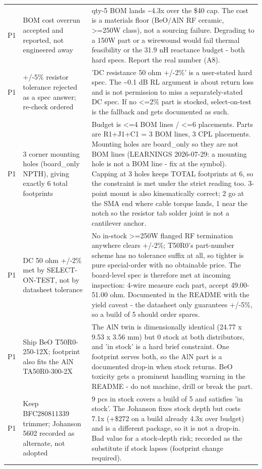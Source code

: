 \documentclass[11pt,a4paper]{article}
\begin{document}
{\begin{longtable}{lp{5.2cm}p{7.2cm}}
P1 & BOM cost overrun accepted and reported, not engineered away & qty-5 BOM lands \textasciitilde{}4.3x over the \$40 cap. The cost is a materials floor (BeO/AlN RF ceramic, \textgreater{}=250W class), not a sourcing failure. Degrading to a 150W part or a wirewound would fail thermal feasibility or the 31.9 nH reactance budget - both hard specs. Report the real number (A8). \\
P1 & +/-5\% resistor tolerance rejected as a spec answer; re-check ordered & 'DC resistance 50 ohm +/-2\%' is a user-stated hard spec. The \textasciitilde{}0.1 dB RL argument is about return loss and is not permission to miss a separately-stated DC spec. If no \textless{}=2\% part is stocked, select-on-test is the fallback and gets documented as such. \\
P1 & 3 corner mounting holes (board\_only NPTH), giving exactly 6 total footprints & Budget is \textless{}=4 BOM lines / \textless{}=6 placements. Parts are R1+J1+C1 = 3 BOM lines, 3 CPL placements. Mounting holes are board\_only so they are not BOM lines (LEARNINGS 2026-07-29: a mounting hole is not a BOM line - fix at the symbol). Capping at 3 holes keeps TOTAL footprints at 6, so the constraint is met under the strict reading too. 3-point mount is also kinematically correct; 2 go at the SMA end where cable torque lands, 1 near the notch so the resistor tab solder joint is not a cantilever anchor. \\
P1 & DC 50 ohm +/-2\% met by SELECT-ON-TEST, not by datasheet tolerance & No in-stock \textgreater{}=250W flanged RF termination anywhere clears +/-2\%; T50R0's part-number scheme has no tolerance suffix at all, so tighter is pure special-order with no obtainable price. The board-level spec is therefore met at incoming inspection: 4-wire measure each part, accept 49.00-51.00 ohm. Documented in the README with the yield caveat - the datasheet only guarantees +/-5\%, so a build of 5 should order spares. \\
P1 & Ship BeO T50R0-250-12X; footprint also fits the AlN TA50R0-300-2X & The AlN twin is dimensionally identical (24.77 x 9.53 x 3.56 mm) but 0 stock at both distributors, and 'in stock' is a hard brief constraint. One footprint serves both, so the AlN part is a documented drop-in when stock returns. BeO toxicity gets a prominent handling warning in the README - do not machine, drill or break the part. \\
P1 & Keep BFC280811339 trimmer; Johanson 5602 recorded as alternate, not adopted & 9 pcs in stock covers a build of 5 and satisfies 'in stock'. The Johanson fixes stock depth but costs 7.1x (+\$272 on a build already 4.3x over budget) and is a different package, so it is not a drop-in. Bad value for a stock-depth risk; recorded as the substitute if stock lapses (footprint change required). \\

\end{longtable}}
\end{document}
